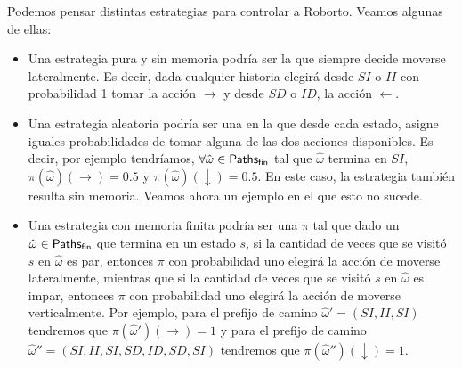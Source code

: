 Podemos pensar distintas estrategias para controlar a Roborto. Veamos algunas
de ellas:
\begin{itemize}
	\item Una estrategia pura y sin memoria podría ser la que siempre decide moverse
	      lateralmente. Es decir, dada cualquier historia elegirá desde $SI$ o $II$ con
	      probabilidad 1 tomar la acción $\rightarrow$ y desde $SD$ o $ID$, la acción
	      $\leftarrow$.
	\item Una estrategia aleatoria podría ser una en la que desde cada estado, asigne
	      iguales probabilidades de tomar alguna de las dos acciones disponibles. Es
	      decir, por ejemplo tendríamos, $\forall \hat \omega \in \textsf{Paths}_\textsf{fin}$ tal que
	      $\hat \omega$ termina en $SI$, $\pi(\hat \omega)(\rightarrow) = 0.5$ y
	      $\pi(\hat \omega)(\downarrow) = 0.5$.
	      En este caso, la estrategia también resulta sin memoria. Veamos ahora un
	      ejemplo en el que esto no sucede.
	\item Una estrategia con memoria finita podría ser una $\pi$ tal que dado un $\hat
		      \omega \in \textsf{Paths}_\textsf{fin}$ que termina en un estado $s$, si la cantidad de veces que
	      se visitó $s$ en $\hat \omega$ es par, entonces $\pi$ con probabilidad uno
	      elegirá la acción de moverse lateralmente, mientras que si la cantidad de veces
	      que se visitó $s$ en $\hat \omega$ es impar, entonces $\pi$ con probabilidad
	      uno elegirá la acción de moverse verticalmente. Por ejemplo, para el prefijo de
	      camino $\hat \omega' = (SI, II, SI)$ tendremos que $\pi(\hat
		      \omega')(\rightarrow) = 1$ y para el prefijo de camino $\hat \omega''=(SI, II,
		      SI, SD, ID, SD, SI)$ tendremos que $\pi(\hat \omega'')(\downarrow) = 1$.
\end{itemize}




